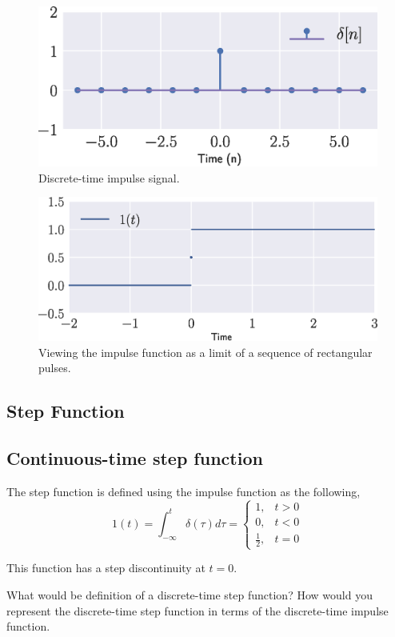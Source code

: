 \begin{figure}[h!]
    \centering
    \includegraphics[width=\columnwidth]{figs/ch2-impulse-disc.eps}
    \caption{Discrete-time impulse signal.}
    \label{fig:ch2-impdisc}
\end{figure}


\begin{figure}[h]
    \centering
    \includegraphics[width=\columnwidth]{figs/ch2-step-cont.eps}
    \caption{Viewing the impulse function as a limit of a sequence of rectangular pulses.}
    \label{fig:ch2-stepcont}
\end{figure}

\subsection{Step Function}
\subsection{Continuous-time step function}
The step function is defined using the impulse function as the following,
\[ 1\left(t\right) = \int_{-\infty}^{t}\delta\left(\tau\right)d\tau = 
\begin{cases}
    1, & t > 0 \\
    0, & t < 0 \\
    \frac{1}{2}, & t = 0
\end{cases} 
\]

\noindent This function has a step discontinuity at $t = 0$.

\begin{problem*}[frametitle=Discrete-time step signal]
    What would be definition of a discrete-time step function? How would you represent the discrete-time step function in terms of the discrete-time impulse function. 
\end{problem*}
